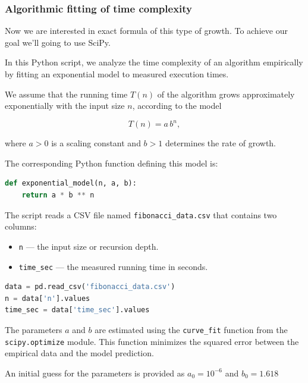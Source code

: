 \documentclass{article}
\begin{document}
%
\subsubsection{Algorithmic fitting of time complexity}
Now we are interested in exact formula of this type of growth. To achieve our goal we'll going to use SciPy.

In this Python script, we analyze the time complexity of an algorithm empirically by fitting an exponential model to measured execution times.


We assume that the running time $T(n)$ of the algorithm grows approximately exponentially with the input size $n$, according to the model

\[
	T(n) = a \, b^n,
\]

where $a > 0$ is a scaling constant and $b > 1$ determines the rate of growth.

The corresponding Python function defining this model is:

\begin{lstlisting}[language=Python]
def exponential_model(n, a, b):
    return a * b ** n
\end{lstlisting}

The script reads a CSV file named \texttt{fibonacci\_data.csv} that contains two columns:

\begin{itemize}
	\item \texttt{n} — the input size or recursion depth.
	\item \texttt{time\_sec} — the measured running time in seconds.
\end{itemize}

\begin{lstlisting}[language=Python]
data = pd.read_csv('fibonacci_data.csv')
n = data['n'].values
time_sec = data['time_sec'].values
\end{lstlisting}

The parameters $a$ and $b$ are estimated using the \texttt{curve\_fit} function from the \texttt{scipy.optimize} module. This function minimizes the squared error between the empirical data and the model prediction.

An initial guess for the parameters is provided as $a_0 = 10^{-6}$ and $b_0 = 1.618$
\end{document}
